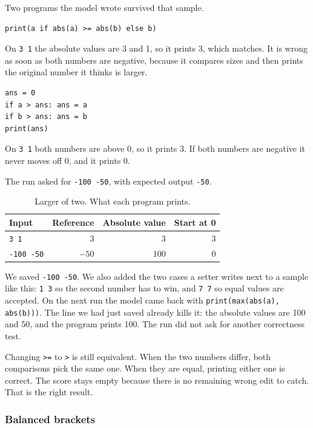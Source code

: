 \documentclass[11pt,a4paper]{article}
\begin{document}
Two programs the model wrote survived that sample.

\begin{lstlisting}
print(a if abs(a) >= abs(b) else b)
\end{lstlisting}

On \texttt{3 1} the absolute values are 3 and 1, so it prints 3, which matches. It is wrong as soon as both numbers are negative, because it compares sizes and then prints the original number it thinks is larger.

\begin{lstlisting}
ans = 0
if a > ans: ans = a
if b > ans: ans = b
print(ans)
\end{lstlisting}

On \texttt{3 1} both numbers are above 0, so it prints 3. If both numbers are negative it never moves off 0, and it prints 0.

The run asked for \texttt{-100 -50}, with expected output \texttt{-50}.

\begin{table}[ht]
\centering
\caption{Larger of two. What each program prints.}
\label{tab:larger}
{\small
\begin{tabular}{@{}l r r r@{}}
\toprule
Input & Reference & Absolute value & Start at 0 \\
\midrule
\texttt{3 1} & 3 & 3 & 3 \\
\texttt{-100 -50} & $-50$ & 100 & 0 \\
\bottomrule
\end{tabular}
}
\end{table}

We saved \texttt{-100 -50}. We also added the two cases a setter writes next to a sample like this: \texttt{1 3} so the second number has to win, and \texttt{7 7} so equal values are accepted. On the next run the model came back with \texttt{print(max(abs(a), abs(b)))}. The line we had just saved already kills it: the absolute values are 100 and 50, and the program prints 100. The run did not ask for another correctness test.

Changing \texttt{>=} to \texttt{>} is still equivalent. When the two numbers differ, both comparisons pick the same one. When they are equal, printing either one is correct. The score stays empty because there is no remaining wrong edit to catch. That is the right result.

\subsubsection{Balanced brackets}
\end{document}
